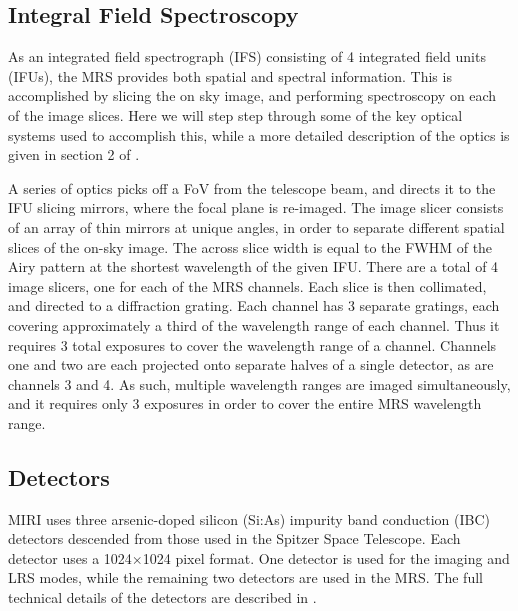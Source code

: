 \subsection{Integral Field Spectroscopy}
As an integrated field spectrograph (IFS) consisting of 4 integrated field units (IFUs), the MRS provides both spatial and spectral information.
This is accomplished by slicing the on sky image, and performing spectroscopy on each of the image slices. 
Here we will step step through some of the key optical systems used to accomplish this, while a more detailed description of the optics is given in section 2 of \parencite{MIRI6}.

A series of optics picks off a FoV from the telescope beam, and directs it to the IFU slicing mirrors, where the focal plane is re-imaged. 
The image slicer consists of an array of thin mirrors at unique angles, in order to separate different spatial slices of the on-sky image.
The across slice width is equal to the FWHM of the Airy pattern at the shortest wavelength of the given IFU.
There are a total of 4 image slicers, one for each of the MRS channels.
Each slice is then collimated, and directed to a diffraction grating. Each channel has 3 separate gratings, each covering approximately a third of the wavelength range of each channel. 
Thus it requires 3 total exposures to cover the wavelength range of a channel.
Channels one and two are each projected onto separate halves of a single detector, as are channels 3 and 4.
As such, multiple wavelength ranges are imaged simultaneously, and it requires only 3 exposures in order to cover the entire MRS wavelength range. 
\subsection{Detectors}
MIRI uses three arsenic-doped silicon (Si:As) impurity band conduction (IBC) detectors descended from those used in the Spitzer Space Telescope.
Each detector uses a 1024$\times$1024 pixel format.
One detector is used for the imaging and LRS modes, while the remaining two detectors are used in the MRS.
The full technical details of the detectors are described in \parencite{MIRI7}.

